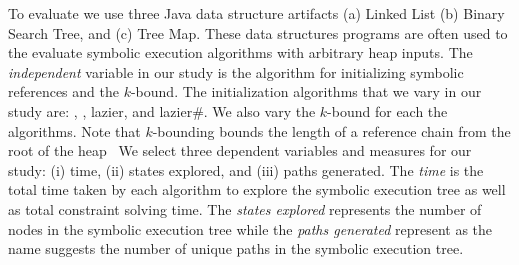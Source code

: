 To evaluate we use three Java data structure artifacts (a) Linked List
(b) Binary Search Tree, and (c) Tree Map. These data structures
programs are often used to the evaluate symbolic execution algorithms
with arbitrary heap inputs. The \emph{independent} variable in our
study is the algorithm for initializing symbolic references and the
$k$-bound. The initialization algorithms that we vary in our study
are: \symtxt{}, \gsetxt{}, lazier, and lazier\#. We also vary the
$k$-bound for each the algorithms. Note that $k$-bounding bounds the
length of a reference chain from the root of the heap~\cite{Deng:2006}
We select three dependent variables and measures for our study: (i)
time, (ii) states explored, and (iii) paths generated. The \emph{time}
is the total time taken by each algorithm to explore the symbolic
execution tree as well as total constraint solving time. The
\emph{states explored} represents the number of nodes in the symbolic
execution tree while the \emph{paths generated} represent as the name
suggests the number of unique paths in the symbolic execution tree.


